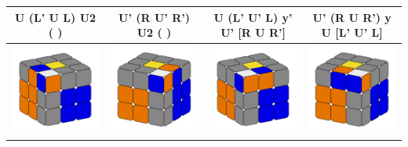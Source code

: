 \documentclass[12pt, a3paper]{article}
\newcommand{\scale}{1}
\begin{document}
\begin{center}
\begin{longtable}{c|c||c|c}
	U (L' U L) U2 ( ) & U' (R U' R') U2 ( ) & U (L' U' L) y' U' [R U R'] & U' (R U R') y U [L' U' L] \\
	\hline
	\hline
	\includegraphics[scale=\scale]{11l} & \includegraphics[scale=\scale]{11r}  &  \includegraphics[scale=\scale]{12l} & \includegraphics[scale=\scale]{12r} \\

\end{longtable}
\end{center}
\end{document}
